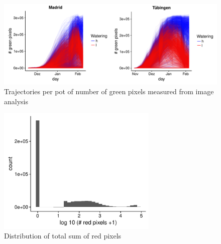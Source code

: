 \documentclass[12pt,]{article}
\begin{document}
\begin{figure}
 \centerline{\includegraphics[width=5in]{../figs/Figure_green_trajectory.pdf}}
    \caption{ Trajectories per pot of number of green pixels measured from image analysis}
    \label{fig:growth}
\end{figure}

\begin{figure}
 \centerline{\includegraphics[width=3in]{../figs/Figure_redcount_histogram.pdf}}
    \caption{ Distribution of total sum of red pixels}
    \label{fig:red}
\end{figure}
\end{document}
